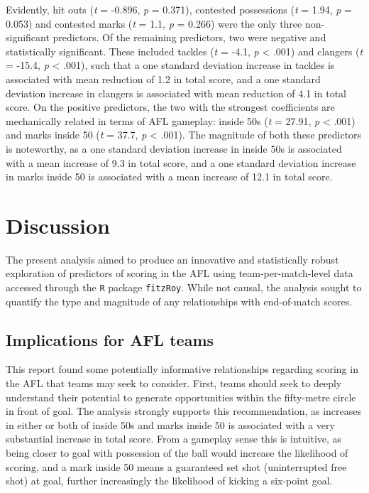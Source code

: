 \documentclass{article}
\begin{document}
Evidently, hit outs (\emph{t} = -0.896, \emph{p} = 0.371), contested
possessions (\emph{t} = 1.94, \emph{p} = 0.053) and contested marks
(\emph{t} = 1.1, \emph{p} = 0.266) were the only three non-significant
predictors. Of the remaining predictors, two were negative and
statistically significant. These included tackles (\emph{t} = -4.1,
\emph{p} \textless{} .001) and clangers (\emph{t} = -15.4, \emph{p}
\textless{} .001), such that a one standard deviation increase in
tackles is associated with mean reduction of 1.2 in total score, and a
one standard deviation increase in clangers is associated with mean
reduction of 4.1 in total score. On the positive predictors, the two
with the strongest coefficients are mechanically related in terms of AFL
gameplay: inside 50s (\emph{t} = 27.91, \emph{p} \textless{} .001) and
marks inside 50 (\emph{t} = 37.7, \emph{p} \textless{} .001). The
magnitude of both these predictors is noteworthy, as a one standard
deviation increase in inside 50s is associated with a mean increase of
9.3 in total score, and a one standard deviation increase in marks
inside 50 is associated with a mean increase of 12.1 in total score.

\hypertarget{discussion}{%
\section{Discussion}\label{discussion}}

The present analysis aimed to produce an innovative and statistically
robust exploration of predictors of scoring in the AFL using
team-per-match-level data accessed through the \texttt{R} package
\texttt{fitzRoy}. While not causal, the analysis sought to quantify the
type and magnitude of any relationships with end-of-match scores.

\hypertarget{implications-for-afl-teams}{%
\subsection{Implications for AFL
teams}\label{implications-for-afl-teams}}

This report found some potentially informative relationships regarding
scoring in the AFL that teams may seek to consider. First, teams should
seek to deeply understand their potential to generate opportunities
within the fifty-metre circle in front of goal. The analysis strongly
supports this recommendation, as increases in either or both of inside
50s and marks inside 50 is associated with a very substantial increase
in total score. From a gameplay sense this is intuitive, as being closer
to goal with possession of the ball would increase the likelihood of
scoring, and a mark inside 50 means a guaranteed set shot (uninterrupted
free shot) at goal, further increasingly the likelihood of kicking a
six-point goal.
\end{document}
